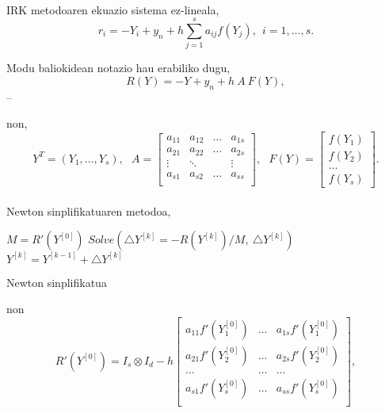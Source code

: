 \paragraph*{}IRK metodoaren ekuazio sistema ez-lineala,
\begin{equation*}
r_i=-Y_i+y_n+h \sum\limits_{j=1}^{s} a_{ij} f(Y_j), \ \ i=1,\dots,s.
\end{equation*}

Modu baliokidean notazio hau erabiliko dugu,
\begin{equation*}
R(Y)=-Y+y_n+ h \ A \ F(Y), 
\end{equation*}--

non,
\begin{equation*}
Y^T=(Y_1,\dots,Y_s), \ \ \
A=
\begin{bmatrix}
   a_{11} & a_{12} & \dots & a_{1s}\\
   a_{21} & a_{22} & \dots & a_{2s}\\
    \vdots & \ddots & & \vdots \\
   a_{s1} & a_{s2} & \dots & a_{ss}\\
\end{bmatrix}
, \ \ \ 
F(Y)=
\begin{bmatrix}
     f(Y_1) \\
     f(Y_2) \\
     \dots  \\
     f(Y_s)
\end{bmatrix}.     
\end{equation*}

\paragraph*{} Newton sinplifikatuaren metodoa,
\begin{algorithm}[h]
  $M=R'(Y^{[0]})$\;
  {
   \BlankLine
   $Solve(\triangle Y^{[k]}=- R(Y^{[k]})/M, \ \triangle Y^{[k]})$\;
   \BlankLine
   $Y^{[k]}=Y^{[k-1]}+\triangle Y^{[k]}$\;
  }
 \caption{Newton sinplifikatua}
\end{algorithm}

non 
\begin{equation*}
R'(Y^{[0]})=I_s \otimes I_d - h  
\begin{bmatrix}
a_{11} f'(Y_1^{[0]}) & \dots & a_{1s} f'(Y_1^{[0]}) \\
a_{21} f'(Y_2^{[0]}) & \dots & a_{2s} f'(Y_2^{[0]}) \\
\dots          & \dots & \dots \\
a_{s1} f'(Y_s^{[0]}) & \dots & a_{ss} f'(Y_s^{[0]}) \\ 
\end{bmatrix},
\end{equation*}

